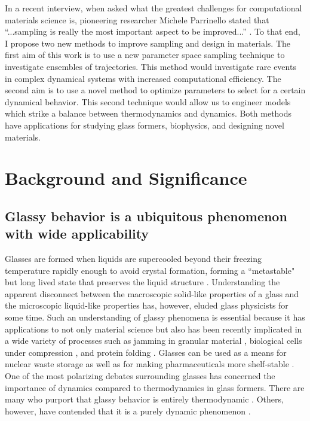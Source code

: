 \documentclass[11pt]{article}
\begin{document}
In a recent interview, when asked what the greatest challenges for computational materials science is, pioneering researcher Michele Parrinello stated that ``...sampling is really the most important aspect to be improved...'' \cite{Parrinello2010}.
To that end, I propose two new methods to improve sampling and design in materials.  The first aim of this work is to use a new parameter space sampling technique to investigate ensembles of trajectories.  This method would investigate rare events in complex dynamical systems with increased computational efficiency. The second aim is to use a novel method to optimize parameters to select for a certain dynamical behavior.  This second technique would allow us to engineer models which strike a balance between thermodynamics and dynamics.  Both methods have applications for studying glass formers, biophysics, and designing novel materials.

\section*{Background and Significance}

\subsection*{Glassy behavior is a ubiquitous phenomenon with wide applicability}
Glasses are formed when liquids are supercooled beyond their freezing temperature rapidly enough to avoid crystal formation, forming a ``metastable" but long lived state that preserves the liquid structure \cite{Ediger1996, Angell_Science_1995}.   Understanding the apparent disconnect between the macroscopic solid-like properties of a glass and the microscopic liquid-like properties has, however, eluded glass physicists for some time. Such an understanding of glassy phenomena is essential because it has applications to not only material science \cite{Schulli2010} but also has been recently implicated in a wide variety of processes such as jamming in granular material \cite{Clusel2009}, biological cells under compression \cite{Zhou2009}, and protein folding \cite{Gin2009}. Glasses can be used as a means for nuclear waste storage \cite{Sales1984} as well as for making pharmaceuticals more shelf-stable \cite{Craig1999}. One of the most polarizing debates surrounding glasses has concerned the importance of dynamics compared to thermodynamics in glass formers.  There are many who purport that glassy behavior is entirely thermodynamic \cite{Lubchenko_AnnuRevPhysChem_May_2007}. Others, however, have contended that it is a purely dynamic phenomenon \cite{Garrahan2003}.
\end{document}
